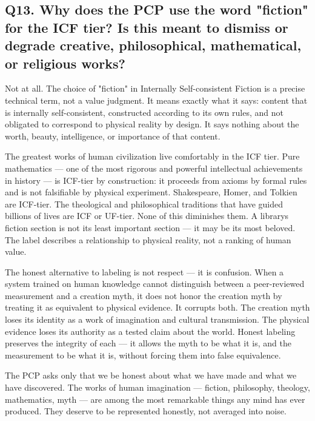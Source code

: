 \documentclass[12pt]{article}
\begin{document}
\subsection{Q13. Why does the PCP use the word "fiction" for the ICF
tier? Is this meant to dismiss or degrade creative, philosophical,
mathematical, or religious
works?}\label{q13.-why-does-the-pcp-use-the-word-fiction-for-the-icf-tier-is-this-meant-to-dismiss-or-degrade-creative-philosophical-mathematical-or-religious-works}

Not at all. The choice of "fiction" in Internally Self-consistent
Fiction is a precise technical term, not a value judgment. It means
exactly what it says: content that is internally self-consistent,
constructed according to its own rules, and not obligated to correspond
to physical reality by design. It says nothing about the worth, beauty,
intelligence, or importance of that content.

The greatest works of human civilization live comfortably in the ICF
tier. Pure mathematics --- one of the most rigorous and powerful
intellectual achievements in history --- is ICF-tier by construction: it
proceeds from axioms by formal rules and is not falsifiable by physical
experiment. Shakespeare, Homer, and Tolkien are ICF-tier. The
theological and philosophical traditions that have guided billions of
lives are ICF or UF-tier. None of this diminishes them. A
library\textquotesingle s fiction section is not its least important
section --- it may be its most beloved. The label describes a
relationship to physical reality, not a ranking of human value.

The honest alternative to labeling is not respect --- it is confusion.
When a system trained on human knowledge cannot distinguish between a
peer-reviewed measurement and a creation myth, it does not honor the
creation myth by treating it as equivalent to physical evidence. It
corrupts both. The creation myth loses its identity as a work of
imagination and cultural transmission. The physical evidence loses its
authority as a tested claim about the world. Honest labeling preserves
the integrity of each --- it allows the myth to be what it is, and the
measurement to be what it is, without forcing them into false
equivalence.

The PCP asks only that we be honest about what we have made and what we
have discovered. The works of human imagination --- fiction, philosophy,
theology, mathematics, myth --- are among the most remarkable things any
mind has ever produced. They deserve to be represented honestly, not
averaged into noise.
\end{document}
